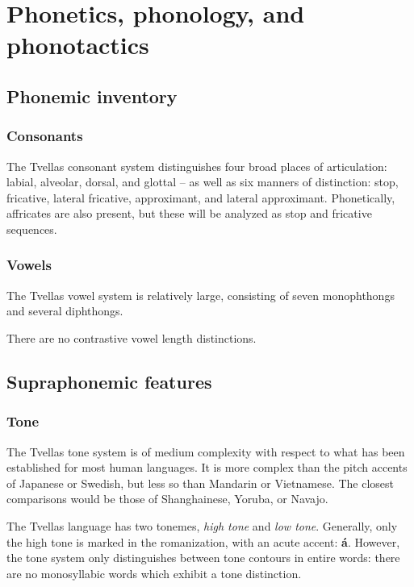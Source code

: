 \chapter{Phonetics, phonology, and phonotactics}

\section{Phonemic inventory}

\subsection{Consonants}

The Tvellas consonant system distinguishes four broad places of articulation: labial, alveolar,
dorsal, and glottal -- as well as six manners of distinction: stop, fricative, lateral fricative,
approximant, and lateral approximant. Phonetically, affricates are also present, but these will be
analyzed as stop and fricative sequences.

\subsection{Vowels}

The Tvellas vowel system is relatively large, consisting of seven monophthongs and several
diphthongs.

There are no contrastive vowel length distinctions.

\section{Supraphonemic features}

\subsection{Tone}

The Tvellas tone system is of medium complexity with respect to what has been established for most
human languages. It is more complex than the pitch accents of Japanese or Swedish, but less so than
Mandarin or Vietnamese. The closest comparisons would be those of Shanghainese, Yoruba, or Navajo.

The Tvellas language has two tonemes, \textit{high tone} and \textit{low tone}. Generally, only the
high tone is marked in the romanization, with an acute accent: \textbf{\'{a}}. However, the tone
system only distinguishes between tone contours in entire words: there are no monosyllabic words
which exhibit a tone distinction.

